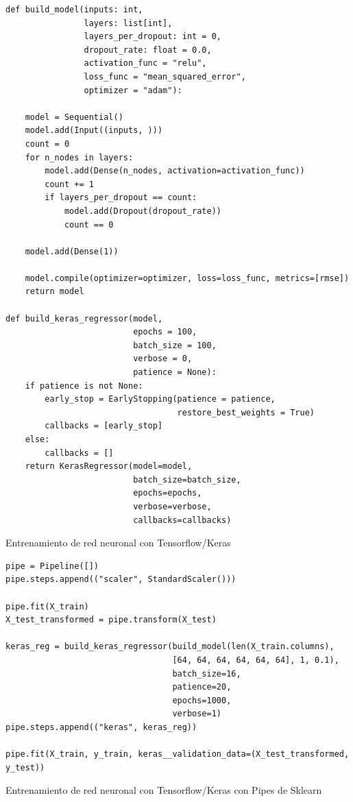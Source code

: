 \documentclass[11pt]{article}
\begin{document}
\begin{listing}
\begin{verbatim}
def build_model(inputs: int,
                layers: list[int],
                layers_per_dropout: int = 0,
                dropout_rate: float = 0.0,
                activation_func = "relu",
                loss_func = "mean_squared_error",
                optimizer = "adam"):
    
    model = Sequential()
    model.add(Input((inputs, )))
    count = 0
    for n_nodes in layers:
        model.add(Dense(n_nodes, activation=activation_func))
        count += 1
        if layers_per_dropout == count:
            model.add(Dropout(dropout_rate))
            count == 0

    model.add(Dense(1))
    
    model.compile(optimizer=optimizer, loss=loss_func, metrics=[rmse])
    return model

def build_keras_regressor(model,
                          epochs = 100,
                          batch_size = 100,
                          verbose = 0,
                          patience = None):
    if patience is not None:
        early_stop = EarlyStopping(patience = patience,
                                   restore_best_weights = True)
        callbacks = [early_stop]
    else:
        callbacks = []
    return KerasRegressor(model=model,
                          batch_size=batch_size,
                          epochs=epochs,
                          verbose=verbose,
                          callbacks=callbacks)
\end{verbatim}
\caption{Entrenamiento de red neuronal con Tensorflow/Keras}
\end{listing}

\begin{listing}
\begin{verbatim}
pipe = Pipeline([])
pipe.steps.append(("scaler", StandardScaler()))

pipe.fit(X_train)
X_test_transformed = pipe.transform(X_test)

keras_reg = build_keras_regressor(build_model(len(X_train.columns),
                                  [64, 64, 64, 64, 64, 64], 1, 0.1),
                                  batch_size=16,
                                  patience=20,
                                  epochs=1000,
                                  verbose=1)
pipe.steps.append(("keras", keras_reg))

pipe.fit(X_train, y_train, keras__validation_data=(X_test_transformed, y_test))
\end{verbatim}
\caption{Entrenamiento de red neuronal con Tensorflow/Keras con Pipes de Sklearn}
\end{listing}
\end{document}
